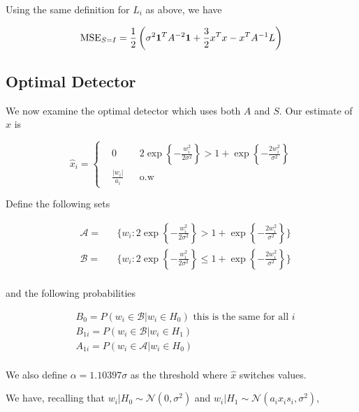 \documentclass[english]{article}
\begin{document}
Using the same definition for $L_i$ as above, we have

\begin{equation}
\text{MSE}_{S=I} = \frac{1}{2}\left(\sigma^2\mathbf 1^TA^{-2}\mathbf 1 + \frac{3}{2}x^Tx -x^TA^{-1}L\right)
\end{equation}

\subsection{Optimal Detector}
We now examine the optimal detector which uses both $A$ and $S$. Our estimate of $x$ is

\begin{equation}
\hat{x}_i=\left\{
\begin{aligned}
&0
&&2\exp\left\{-\frac{w_i^2}{2\sigma^2}\right\} > 1 + \exp\left\{-\frac{2w_i^2}{\sigma^2}\right\}\\
& \frac{|w_i|}{a_i}
&& \text{o.w}
\end{aligned}
\right.
\end{equation}

Define the following sets

\begin{equation}
\begin{aligned}
&\mathcal{A} =
&&\{w_i:2\exp\left\{-\frac{w_i^2}{2\sigma^2}\right\} > 1 + \exp\left\{-\frac{2w_i^2}{\sigma^2}\right\}\}\\
&\mathcal{B} =
&&\{w_i:2\exp\left\{-\frac{w_i^2}{2\sigma^2}\right\} \leq 1 + \exp\left\{-\frac{2w_i^2}{\sigma^2}\right\}\}\\
\end{aligned}
\end{equation}

and the following probabilities

\begin{equation}
\begin{aligned}
&B_0=P(w_i\in \mathcal{B}|w_i\in H_0) \text{ this is the same for all } i\\
&B_{1i} = P(w_i\in \mathcal{B}|w_i\in H_1)\\
&A_{1i} = P(w_i\in \mathcal{A}|w_i\in H_0)\\
\end{aligned}
\end{equation}

We also define $\alpha = 1.10397\sigma$ as the threshold where $\hat{x}$ switches values.

We have, recalling that $w_i|H_0\sim\mathcal{N}(0,\sigma^2)$ and $w_i|H_1\sim\mathcal{N}(a_ix_is_i,\sigma^2)$,
\end{document}
